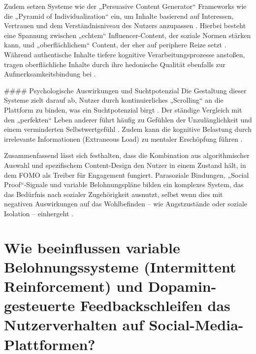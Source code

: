 \documentclass[11pt,a4paper]{article}
\begin{document}
Zudem setzen Systeme wie der „Persuasive Content Generator“ Frameworks wie die „Pyramid of Individualization“ ein, um Inhalte basierend auf Interessen, Vertrauen und dem Verständnisniveau des Nutzers anzupassen \autocite{crossref_10_22215_etd_2019_13484}. Hierbei besteht eine Spannung zwischen „echtem“ Influencer-Content, der soziale Normen stärken kann, und „oberflächlichem“ Content, der eher auf periphere Reize setzt \autocite{doaj_1ebaf951e0734f32b8da2689a45a3dfd}. Während authentische Inhalte tiefere kognitive Verarbeitungsprozesse anstoßen, tragen oberflächliche Inhalte durch ihre hedonische Qualität ebenfalls zur Aufmerksamkeitsbindung bei \autocite{doaj_1ebaf951e0734f32b8da2689a45a3dfd,openalex_W2946816985}.

\#\#\#\# Psychologische Auswirkungen und Suchtpotenzial Die Gestaltung dieser Systeme zielt darauf ab, Nutzer durch kontinuierliches „Scrolling“ an die Plattform zu binden, was ein Suchtpotenzial birgt \autocite{grey_grey_3467cac0f11d4b1e86319128da218a3e}. Der ständige Vergleich mit den „perfekten“ Leben anderer führt häufig zu Gefühlen der Unzulänglichkeit und einem verminderten Selbstwertgefühl \autocite{grey_grey_3467cac0f11d4b1e86319128da218a3e,grey_grey_f99abd6bfbd04efc8def60bb6988ce35,grey_grey_8407dc6841b0415a989fd351e0065df0}. Zudem kann die kognitive Belastung durch irrelevante Informationen (Extraneous Load) zu mentaler Erschöpfung führen \autocite{grey_grey_d4bc9c0d0e8441ba90398520e73af07d}.

Zusammenfassend lässt sich festhalten, dass die Kombination aus algorithmischer Auswahl und spezifischem Content-Design den Nutzer in einem Zustand hält, in dem FOMO als Treiber für Engagement fungiert. Parasoziale Bindungen, „Social Proof“-Signale und variable Belohnungspläne bilden ein komplexes System, das das Bedürfnis nach sozialer Zugehörigkeit ausnutzt, selbst wenn dies mit negativen Auswirkungen auf das Wohlbefinden – wie Angstzustände oder soziale Isolation – einhergeht \autocite{doaj_10febcbb5e60420699a1d4570a075832,europepmc_42137086,grey_grey_3467cac0f11d4b1e86319128da218a3e}.

\section{Wie beeinflussen variable Belohnungssysteme (Intermittent Reinforcement) und Dopamin-gesteuerte Feedbackschleifen das Nutzerverhalten auf Social-Media-Plattformen?}
\end{document}
